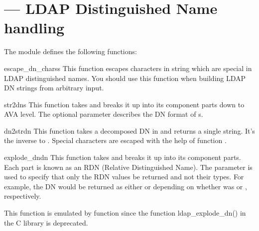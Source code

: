 
\section{ ---
  LDAP Distinguished Name handling }




\begin{seealso}
\end{seealso}

The  module defines the following functions:

\begin{funcdesc}{escape_dn_chars}{s} %
  This function escapes characters in string  which
  are special in LDAP distinguished names. You should use
  this function when building LDAP DN strings from arbitrary input.
\end{funcdesc}

\begin{funcdesc}{str2dn}{s } %
  This function takes  and breaks it up into its component parts
  down to AVA level.
  The optional parameter  describes the DN format of s.
  \begin{seealso}
  \end{seealso}
\end{funcdesc}


\begin{funcdesc}{dn2str}{dn} %
  This function takes a decomposed DN in  and returns
  a single string. It's the inverse to .
  Special characters are escaped with the help of
  function .
\end{funcdesc}


\begin{funcdesc}{explode_dn}{dn } %
  This function takes  and breaks it up into its component parts. 
  Each part is known as an RDN (Relative Distinguished Name). The
   parameter is used to specify that only the RDN values be 
  returned and not their types.
  For example, the DN  would be
  returned as either \code{["cn=Bob", "c=US"]} or \code{["Bob","US"]}
  depending on whether  was  or ,
  respectively.

  This function is emulated by function 
  since the function ldap_explode_dn() in the C library is deprecated.
\end{funcdesc}

